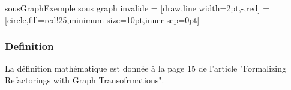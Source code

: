 \documentclass[a4paper, 12pt]{article}
\begin{document}
\begin{myfig}{sousGraph}{Exemple sous graph invalide}
 = [draw,line width=2pt,-,red]
=[circle,fill=red!25,minimum size=10pt,inner sep=0pt]
\end{myfig}


\subsubsection{Definition}

La définition mathématique est donnée à la page 15 de l'article "Formalizing Refactorings with Graph Transofrmations".
\end{document}

